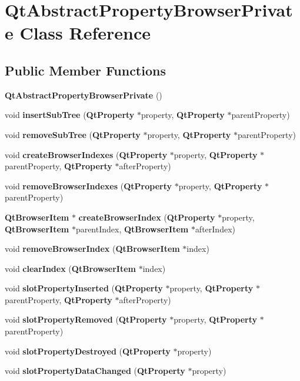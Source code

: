 \section{Qt\+Abstract\+Property\+Browser\+Private Class Reference}
\label{classQtAbstractPropertyBrowserPrivate}
\subsection*{Public Member Functions}
\begin{DoxyCompactItemize}
\item 
{\bf Qt\+Abstract\+Property\+Browser\+Private} ()
\item 
void {\bf insert\+Sub\+Tree} ({\bf Qt\+Property} $\ast$property, {\bf Qt\+Property} $\ast$parent\+Property)
\item 
void {\bf remove\+Sub\+Tree} ({\bf Qt\+Property} $\ast$property, {\bf Qt\+Property} $\ast$parent\+Property)
\item 
void {\bf create\+Browser\+Indexes} ({\bf Qt\+Property} $\ast$property, {\bf Qt\+Property} $\ast$parent\+Property, {\bf Qt\+Property} $\ast$after\+Property)
\item 
void {\bf remove\+Browser\+Indexes} ({\bf Qt\+Property} $\ast$property, {\bf Qt\+Property} $\ast$parent\+Property)
\item 
{\bf Qt\+Browser\+Item} $\ast$ {\bf create\+Browser\+Index} ({\bf Qt\+Property} $\ast$property, {\bf Qt\+Browser\+Item} $\ast$parent\+Index, {\bf Qt\+Browser\+Item} $\ast$after\+Index)
\item 
void {\bf remove\+Browser\+Index} ({\bf Qt\+Browser\+Item} $\ast$index)
\item 
void {\bf clear\+Index} ({\bf Qt\+Browser\+Item} $\ast$index)
\item 
void {\bf slot\+Property\+Inserted} ({\bf Qt\+Property} $\ast$property, {\bf Qt\+Property} $\ast$parent\+Property, {\bf Qt\+Property} $\ast$after\+Property)
\item 
void {\bf slot\+Property\+Removed} ({\bf Qt\+Property} $\ast$property, {\bf Qt\+Property} $\ast$parent\+Property)
\item 
void {\bf slot\+Property\+Destroyed} ({\bf Qt\+Property} $\ast$property)
\item 
void {\bf slot\+Property\+Data\+Changed} ({\bf Qt\+Property} $\ast$property)
\end{DoxyCompactItemize}
